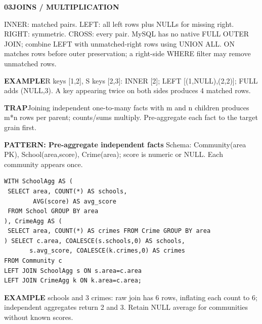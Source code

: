 \documentclass[a4paper]{article}
\newcommand{\bodyfontsize}{5.55}
\newcommand{\bodyleading}{5.3}
\newcommand{\bodylineskiplimit}{-2pt}
\newcommand{\bodystyle}{%
  \fontsize{\bodyfontsize}{\bodyleading}\selectfont\setlength{\lineskiplimit}{\bodylineskiplimit}\RaggedRight
  \setlength{\abovedisplayskip}{.5pt}\setlength{\belowdisplayskip}{.5pt}%
  \setlength{\abovedisplayshortskip}{.3pt}\setlength{\belowdisplayshortskip}{.3pt}}
\newcommand{\topic}[2]{\par\addvspace{.45pt}\nointerlineskip%
  \begingroup\setlength{\fboxsep}{0.35pt}%
  \noindent\colorbox{structure}{\parbox{\dimexpr\linewidth-2\fboxsep\relax}{%
    \color{white}\fontsize{6.45}{6.8}\selectfont\bfseries #1\enspace #2}}%
  \endgroup\par\nobreak\vspace{.55pt}\nointerlineskip\nobreak}
\newenvironment{topicblock}
  {\par\bodystyle}
  {\par}
\newcommand{\key}[1]{\par\textcolor{structure}{\textbf{#1}}\enspace}
\newcommand{\note}[4]{\par\nointerlineskip\vspace{.25pt}\begingroup\setlength{\fboxsep}{0.1pt}%
  \noindent\colorbox{#1}{\parbox{\dimexpr\linewidth-2\fboxsep\relax}{%
    \RaggedRight\textcolor{#2}{\textbf{#3}}\enspace #4}}%
  \endgroup\par\nointerlineskip\vspace{.25pt}}
\newcommand{\trap}[1]{\note{warningbg}{warning}{TRAP}{#1}}
\newcommand{\ex}[1]{\note{examplebg}{example}{EXAMPLE}{#1}}
\newcommand{\pattern}[1]{\key{PATTERN: #1}}
\newlength{\sheetwidth}
\newenvironment{sheetcolumns}[1]
  {\noindent\begin{minipage}[t]{#1\sheetwidth}\vspace{0pt}\bodystyle\ignorespaces}
  {\end{minipage}\par}
\begin{document}
\begin{sheetcolumns}{.254}
\begin{topicblock}
\topic{03}{JOINS / MULTIPLICATION}
INNER: matched pairs. LEFT: all left rows plus NULLs for missing right. RIGHT: symmetric. CROSS: every pair. MySQL has no native FULL OUTER JOIN; combine LEFT with unmatched-right rows using UNION ALL. ON matches rows before outer preservation; a right-side WHERE filter may remove unmatched rows.
\ex{R keys [1,2], S keys [2,3]: INNER [2]; LEFT [(1,NULL),(2,2)]; FULL adds (NULL,3). A key appearing twice on both sides produces 4 matched rows.}
\trap{Joining independent one-to-many facts with m and n children produces m*n rows per parent; counts/sums multiply. Pre-aggregate each fact to the target grain first.}
\pattern{Pre-aggregate independent facts}
Schema: Community(area PK), School(area,score), Crime(area); score is numeric or NULL. Each community appears once.
\begin{lstlisting}
WITH SchoolAgg AS (
 SELECT area, COUNT(*) AS schools,
        AVG(score) AS avg_score
 FROM School GROUP BY area
), CrimeAgg AS (
 SELECT area, COUNT(*) AS crimes FROM Crime GROUP BY area
) SELECT c.area, COALESCE(s.schools,0) AS schools,
       s.avg_score, COALESCE(k.crimes,0) AS crimes
FROM Community c
LEFT JOIN SchoolAgg s ON s.area=c.area
LEFT JOIN CrimeAgg k ON k.area=c.area;
\end{lstlisting}
\ex{2 schools and 3 crimes: raw join has 6 rows, inflating each count to 6; independent aggregates return 2 and 3. Retain NULL average for communities without known scores.}
\end{topicblock}


\end{sheetcolumns}
\end{document}
